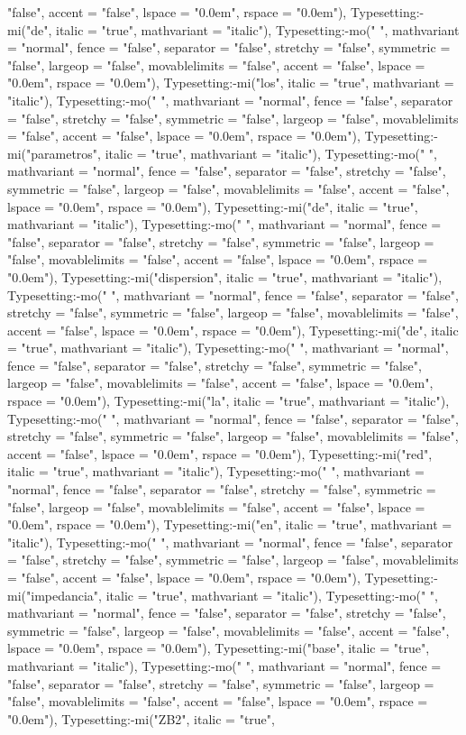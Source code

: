 \documentclass{article}
\begin{document}
\begin{Maple Normal}
{\begin{Maple Normal}
{"false", accent = "false", lspace = "0.0em", rspace = "0.0em"), Typesetting:-mi("de", italic = "true", mathvariant = "italic"), Typesetting:-mo(" ", mathvariant = "normal", fence = "false", separator = "false", stretchy = "false", symmetric = "false", largeop = "false", movablelimits = "false", accent = "false", lspace = "0.0em", rspace = "0.0em"), Typesetting:-mi("los", italic = "true", mathvariant = "italic"), Typesetting:-mo(" ", mathvariant = "normal", fence = "false", separator = "false", stretchy = "false", symmetric = "false", largeop = "false", movablelimits = "false", accent = "false", lspace = "0.0em", rspace = "0.0em"), Typesetting:-mi("parametros", italic = "true", mathvariant = "italic"), Typesetting:-mo(" ", mathvariant = "normal", fence = "false", separator = "false", stretchy = "false", symmetric = "false", largeop = "false", movablelimits = "false", accent = "false", lspace = "0.0em", rspace = "0.0em"), Typesetting:-mi("de", italic = "true", mathvariant = "italic"), Typesetting:-mo(" ", mathvariant = "normal", fence = "false", separator = "false", stretchy = "false", symmetric = "false", largeop = "false", movablelimits = "false", accent = "false", lspace = "0.0em", rspace = "0.0em"), Typesetting:-mi("dispersion", italic = "true", mathvariant = "italic"), Typesetting:-mo(" ", mathvariant = "normal", fence = "false", separator = "false", stretchy = "false", symmetric = "false", largeop = "false", movablelimits = "false", accent = "false", lspace = "0.0em", rspace = "0.0em"), Typesetting:-mi("de", italic = "true", mathvariant = "italic"), Typesetting:-mo(" ", mathvariant = "normal", fence = "false", separator = "false", stretchy = "false", symmetric = "false", largeop = "false", movablelimits = "false", accent = "false", lspace = "0.0em", rspace = "0.0em"), Typesetting:-mi("la", italic = "true", mathvariant = "italic"), Typesetting:-mo(" ", mathvariant = "normal", fence = "false", separator = "false", stretchy = "false", symmetric = "false", largeop = "false", movablelimits = "false", accent = "false", lspace = "0.0em", rspace = "0.0em"), Typesetting:-mi("red", italic = "true", mathvariant = "italic"), Typesetting:-mo(" ", mathvariant = "normal", fence = "false", separator = "false", stretchy = "false", symmetric = "false", largeop = "false", movablelimits = "false", accent = "false", lspace = "0.0em", rspace = "0.0em"), Typesetting:-mi("en", italic = "true", mathvariant = "italic"), Typesetting:-mo(" ", mathvariant = "normal", fence = "false", separator = "false", stretchy = "false", symmetric = "false", largeop = "false", movablelimits = "false", accent = "false", lspace = "0.0em", rspace = "0.0em"), Typesetting:-mi("impedancia", italic = "true", mathvariant = "italic"), Typesetting:-mo(" ", mathvariant = "normal", fence = "false", separator = "false", stretchy = "false", symmetric = "false", largeop = "false", movablelimits = "false", accent = "false", lspace = "0.0em", rspace = "0.0em"), Typesetting:-mi("base", italic = "true", mathvariant = "italic"), Typesetting:-mo(" ", mathvariant = "normal", fence = "false", separator = "false", stretchy = "false", symmetric = "false", largeop = "false", movablelimits = "false", accent = "false", lspace = "0.0em", rspace = "0.0em"), Typesetting:-mi("ZB2", italic = "true", }
\end{Maple Normal}}
\end{Maple Normal}
\end{document}
